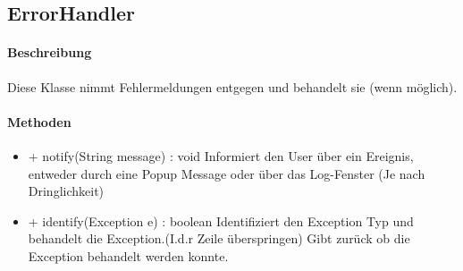 \subsection{ErrorHandler}

\paragraph{Beschreibung}
Diese Klasse nimmt Fehlermeldungen entgegen und behandelt sie (wenn möglich).


\paragraph{Methoden}

\begin{itemize}
\item + notify(String message) : void
Informiert den User über ein Ereignis, entweder durch eine Popup Message oder über das Log-Fenster (Je nach Dringlichkeit)

\item + identify(Exception e) : boolean
Identifiziert den Exception Typ und behandelt die Exception.(I.d.r Zeile überspringen)
Gibt zurück ob die Exception behandelt werden konnte.

\end{itemize}